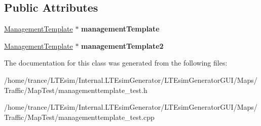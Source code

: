 \subsection*{Public Attributes}
\begin{DoxyCompactItemize}
\item 
\hyperlink{class_management_template}{Management\+Template} $\ast$ {\bfseries management\+Template}\hypertarget{class_management_template___test_a4dd412a3e97b9e85bf984d02fdd60b30}{}\label{class_management_template___test_a4dd412a3e97b9e85bf984d02fdd60b30}

\item 
\hyperlink{class_management_template}{Management\+Template} $\ast$ {\bfseries management\+Template2}\hypertarget{class_management_template___test_acc532e94cdce8f72e8e7ba4e0fbcc821}{}\label{class_management_template___test_acc532e94cdce8f72e8e7ba4e0fbcc821}

\end{DoxyCompactItemize}


The documentation for this class was generated from the following files\+:\begin{DoxyCompactItemize}
\item 
/home/trance/\+L\+T\+Esim/\+Internal.\+L\+T\+Esim\+Generator/\+L\+T\+Esim\+Generator\+G\+U\+I/\+Maps/\+Traffic/\+Map\+Test/managementtemplate\+\_\+test.\+h\item 
/home/trance/\+L\+T\+Esim/\+Internal.\+L\+T\+Esim\+Generator/\+L\+T\+Esim\+Generator\+G\+U\+I/\+Maps/\+Traffic/\+Map\+Test/managementtemplate\+\_\+test.\+cpp\end{DoxyCompactItemize}
